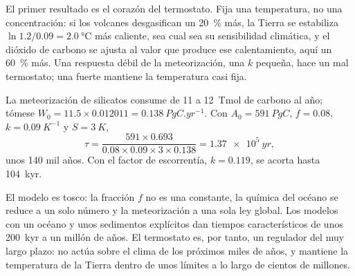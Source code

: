 El primer resultado es el corazón del termostato. Fija una temperatura, no una concentración: si
los volcanes desgasifican un \qty{20}{\percent} más, la Tierra se estabiliza $\ln 1.2/0.09 = \qty{2.0}{\celsius}$
más caliente, sea cual sea su sensibilidad climática, y el dióxido de carbono se ajusta al valor que produce ese
calentamiento, aquí un \qty{60}{\percent} más. Una respuesta débil de la meteorización, una $k$ pequeña, hace un mal
termostato; una fuerte mantiene la temperatura casi fija.

\begin{example}\label{ex:b2:deep-time-climate:tau}
La meteorización de silicatos consume de 11 a \qty{12}{Tmol} de carbono al año; tómese $W_0 = 11.5\times0.012011
= \qty{0.138}{PgC.yr^{-1}}$. Con $A_0 = \qty{591}{PgC}$, $f = 0.08$, $k = \qty{0.09}{K^{-1}}$ y
$S = \qty{3}{K}$,
\[
  \tau = \frac{591\times0.693}{0.08\times0.09\times3\times0.138} = \qty{1.37e5}{yr} ,
\]
unos 140 mil años. Con el factor de escorrentía, $k = 0.119$, se acorta hasta
\qty{104}{kyr}.
\end{example}

El modelo es tosco: la fracción $f$ no es una constante, la química del océano se reduce a un solo
número y la meteorización a una sola ley global. Los modelos con un océano y unos sedimentos explícitos dan
tiempos característicos de unos \qty{200}{kyr} a un millón de años. El termostato es, por tanto, un
regulador del muy largo plazo: no actúa sobre el clima de los próximos miles de años, y
mantiene la temperatura de la Tierra dentro de unos límites a lo largo de cientos de millones.

